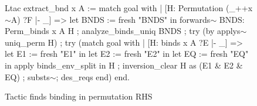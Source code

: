 \begin{figure}
\begin{coq}
Ltac extract_bnd x A :=
  match goal with
    | [H: Permutation (_++x$\sim$A) ?F |- _] =>
      let BNDS := fresh "BNDS" in
      forwards$\sim$ BNDS: Perm_binds x A H
      ; analyze_binds_uniq BNDS
      ; try (by applys$\sim$ uniq_perm H)
      ; try (match goal with
               | [H: binds x A ?E |- _] =>
                 let E1 := fresh "E1" in
                 let E2 := fresh "E2" in
                 let EQ := fresh "EQ" in
                 apply binds_env_split in H
                 ; inversion_clear H as (E1 & E2 & EQ)
                 ; substs$\sim$; des_reqs
             end)
  end.
\end{coq}
\caption{Tactic finds binding in permutation RHS}
\label{fig:extract}
\end{figure}
